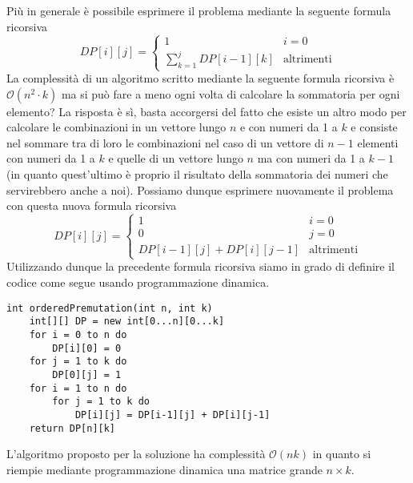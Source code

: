 \documentclass[../cheatSheetAlgoritmi.tex]{subfiles}
\begin{document}
Più in generale è possibile esprimere il problema mediante la seguente formula ricorsiva  
\begin{equation*}
  	DP[i][j]=\begin{cases}
  		1 & \text{$i = 0$}\\
  		\sum_{k = 1}^{j}DP[i-1][k] & \text{altrimenti}
  	\end{cases}
\end{equation*}
La complessità di un algoritmo scritto mediante la seguente formula ricorsiva è $\mathcal{O}(n^{2} \cdot k)$ ma si può fare a meno ogni volta di calcolare la sommatoria per ogni elemento? La risposta è sì, basta accorgersi del fatto che esiste un altro modo per calcolare le combinazioni in un vettore lungo $n$ e con numeri da 1 a $k$ e consiste nel sommare tra di loro le combinazioni nel caso di un vettore di $n-1$ elementi con numeri da 1 a $k$ e quelle di un vettore lungo $n$ ma con numeri da 1 a $k-1$ (in quanto quest'ultimo è proprio il risultato della sommatoria dei numeri che servirebbero anche a noi). Possiamo dunque esprimere nuovamente il problema con questa nuova formula ricorsiva
\begin{equation*}
  	DP[i][j]=\begin{cases}
  		1 & \text{$i = 0$}\\
  		0 & \text{$j = 0$}\\
  		DP[i-1][j] + DP[i][j-1] & \text{altrimenti}
  	\end{cases}
\end{equation*}
Utilizzando dunque la precedente formula ricorsiva siamo in grado di definire il codice come segue usando programmazione dinamica.
\begin{lstlisting}[caption=Conteggio Permutazioni Ordinate]
int orderedPremutation(int n, int k)
	int[][] DP = new int[0...n][0...k]
	for i = 0 to n do
		DP[i][0] = 0
	for j = 1 to k do
		DP[0][j] = 1
	for i = 1 to n do
		for j = 1 to k do
			DP[i][j] = DP[i-1][j] + DP[i][j-1]
	return DP[n][k]
\end{lstlisting}
L'algoritmo proposto per la soluzione ha complessità $\mathcal{O}(nk)$ in quanto si riempie mediante programmazione dinamica una matrice grande $n \times k$.
\newpage
\end{document}
